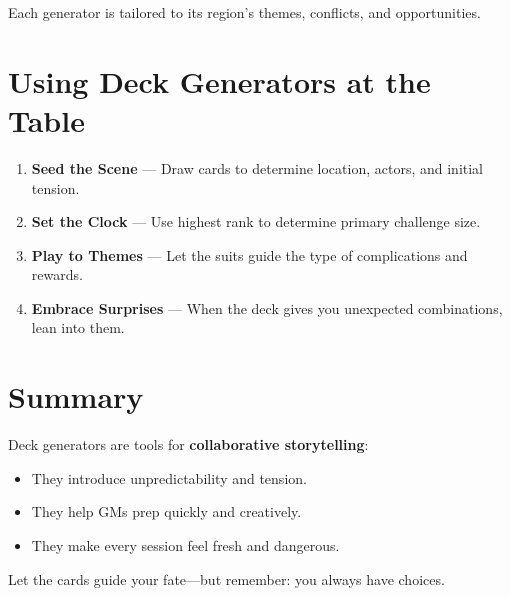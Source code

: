 Each generator is tailored to its region's themes, conflicts, and opportunities.

\section{Using Deck Generators at the Table}

\begin{enumerate}
  \item \textbf{Seed the Scene} — Draw cards to determine location, actors, and initial tension.
  \item \textbf{Set the Clock} — Use highest rank to determine primary challenge size.
  \item \textbf{Play to Themes} — Let the suits guide the type of complications and rewards.
  \item \textbf{Embrace Surprises} — When the deck gives you unexpected combinations, lean into them.
\end{enumerate}

\section{Summary}

Deck generators are tools for \textbf{collaborative storytelling}:

\begin{itemize}
  \item They introduce unpredictability and tension.
  \item They help GMs prep quickly and creatively.
  \item They make every session feel fresh and dangerous.
\end{itemize}

Let the cards guide your fate—but remember: you always have choices.

